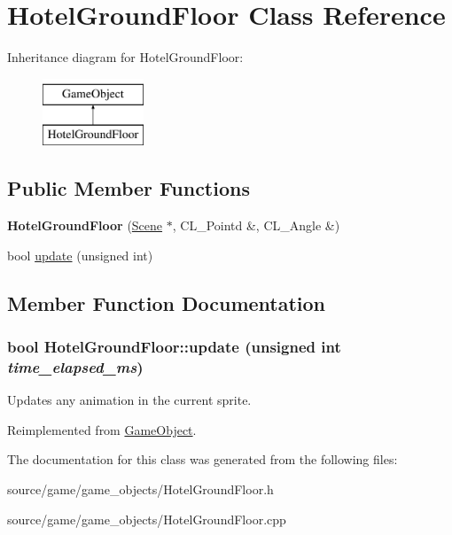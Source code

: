 \hypertarget{classHotelGroundFloor}{
\section{HotelGroundFloor Class Reference}
\label{classHotelGroundFloor}
}
Inheritance diagram for HotelGroundFloor:\begin{figure}[H]
\begin{center}
\leavevmode
\includegraphics[height=2cm]{classHotelGroundFloor}
\end{center}
\end{figure}
\subsection*{Public Member Functions}
\begin{DoxyCompactItemize}
\item 
\hypertarget{classHotelGroundFloor_a3feeaf0aee35b8cd060bf8c21375dff9}{
{\bfseries HotelGroundFloor} (\hyperlink{classScene}{Scene} $\ast$, CL\_\-Pointd \&, CL\_\-Angle \&)}
\label{classHotelGroundFloor_a3feeaf0aee35b8cd060bf8c21375dff9}

\item 
bool \hyperlink{classHotelGroundFloor_a654f889fe9e9d275f2bfee99bef50b76}{update} (unsigned int)
\end{DoxyCompactItemize}


\subsection{Member Function Documentation}
\hypertarget{classHotelGroundFloor_a654f889fe9e9d275f2bfee99bef50b76}{
\subsubsection[{update}]{\setlength{\rightskip}{0pt plus 5cm}bool HotelGroundFloor::update (unsigned int {\em time\_\-elapsed\_\-ms})}}
\label{classHotelGroundFloor_a654f889fe9e9d275f2bfee99bef50b76}
Updates any animation in the current sprite. 

Reimplemented from \hyperlink{classGameObject_ad2f3cd5d1f5a11b237507cd3ee98b95d}{GameObject}.



The documentation for this class was generated from the following files:\begin{DoxyCompactItemize}
\item 
source/game/game\_\-objects/HotelGroundFloor.h\item 
source/game/game\_\-objects/HotelGroundFloor.cpp\end{DoxyCompactItemize}

